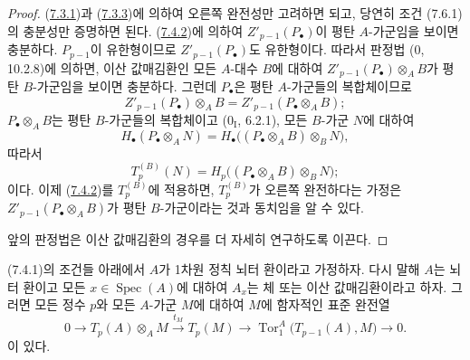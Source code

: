\begin{proof}
(\hyperref[III.7.3.1-fr]{7.3.1})과
(\hyperref[III.7.3.3-fr]{7.3.3})에 의하여 오른쪽 완전성만 고려하면
되고, 당연히 조건 (7.6.1)의 충분성만 증명하면 된다.
(\hyperref[III.7.4.2-fr]{7.4.2})에 의하여
$Z'_{p-1}(P_\bullet)$이 평탄 $A$-가군임을 보이면 충분하다.
$P_{p-1}$이 유한형이므로 $Z'_{p-1}(P_\bullet)$도 유한형이다. 따라서
판정법 ($0$, 10.2.8)에 의하면, 이산 값매김환인 모든 $A$-대수 $B$에
대하여 $Z'_{p-1}(P_\bullet)\otimes_A B$가 평탄 $B$-가군임을 보이면
충분하다. 그런데 $P_\bullet$은 평탄 $A$-가군들의 복합체이므로
\[
  Z'_{p-1}(P_\bullet)\otimes_A B
  =
  Z'_{p-1}(P_\bullet\otimes_A B);
\]
$P_\bullet\otimes_A B$는 평탄 $B$-가군들의 복합체이고
($0_{\mathrm I}$, 6.2.1), 모든 $B$-가군 $N$에 대하여
\[
  H_\bullet(P_\bullet\otimes_A N)
  =
  H_\bullet\bigl((P_\bullet\otimes_A B)\otimes_B N\bigr),
\]
따라서
\[
  T_p^{(B)}(N)
  =
  H_p\bigl((P_\bullet\otimes_A B)\otimes_B N\bigr);
\]
이다. 이제 (\hyperref[III.7.4.2-fr]{7.4.2})를 $T_p^{(B)}$에 적용하면,
$T_p^{(B)}$가 오른쪽 완전하다는 가정은
$Z'_{p-1}(P_\bullet\otimes_A B)$가 평탄 $B$-가군이라는 것과 동치임을
알 수 있다.

앞의 판정법은 이산 값매김환의 경우를 더 자세히 연구하도록 이끈다.
\end{proof}

\begin{proposition}[7.6.3]
\label{III.7.6.3-fr}
(7.4.1)의 조건들 아래에서 $A$가 1차원 정칙 뇌터 환이라고 가정하자.
다시 말해 $A$는 뇌터 환이고 모든 $x\in\operatorname{Spec}(A)$에
대하여 $A_x$는 체 또는 이산 값매김환이라고 하자. 그러면 모든 정수
$p$와 모든 $A$-가군 $M$에 대하여 $M$에 함자적인 표준 완전열
\[
  0
  \longrightarrow T_p(A)\otimes_A M
  \xrightarrow{t_M}T_p(M)
  \longrightarrow \operatorname{Tor}_1^A\bigl(T_{p-1}(A),M\bigr)
  \longrightarrow0.
  \tag{7.6.3.1}\label{III.7.6.3.1.fr}
\]
이 있다.
\end{proposition}

